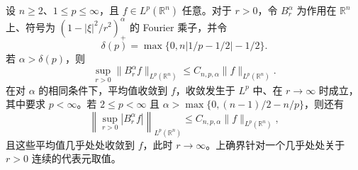 设 $n\ge 2$、$1\le p\le\infty$，且 $f\in L^p(\mathbb R^n)$ 任意。对于 $r>0$，令 $B_r^\alpha$ 为作用在 $\mathbb R^n$ 上、符号为 $(1-|\xi|^2/r^2)_+^\alpha$ 的 Fourier 乘子，并令
\[
\delta(p)=\max\{0,n|1/p-1/2|-1/2\}.
\]
若 $\alpha>\delta(p)$，则
\[
\sup_{r>0}\|B_r^\alpha f\|_{L^p(\mathbb R^n)}
\le C_{n,p,\alpha}\|f\|_{L^p(\mathbb R^n)}.
\]
在对 $\alpha$ 的相同条件下，平均值收敛到 $f$，收敛发生于 $L^p$ 中、在 $r\to\infty$ 时成立，其中要求 $p<\infty$。若 $2\le p<\infty$ 且 $\alpha>\max\{0,(n-1)/2-n/p\}$，则还有
\[
\left\|\sup_{r>0}|B_r^\alpha f|\right\|_{L^p(\mathbb R^n)}
\le C_{n,p,\alpha}\|f\|_{L^p(\mathbb R^n)},
\]
且这些平均值几乎处处收敛到 $f$，此时 $r\to\infty$。上确界针对一个几乎处处关于 $r>0$ 连续的代表元取值。
